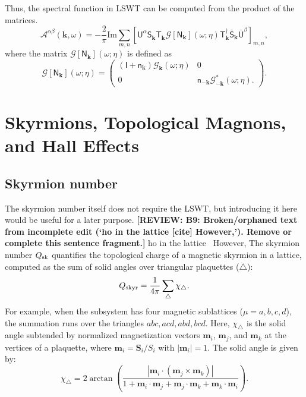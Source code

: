 \documentclass[aps, prx, nofootinbib, superscriptaddress]{revtex4-2}
\newcommand{\REVIEW}[1]{{\color{reviewcolor}\bfseries [REVIEW: #1]}}
\newcommand{\kvec}{\mathbf{k}}
\begin{document}
Thus, the spectral function in LSWT can be computed from the product of the matrices.
\begin{equation}
    \mathcal{A}^{\alpha\beta}(\kvec, \omega) 
    = - \frac{2}{\pi} \mathrm{Im} 
    \sum_{m,n}
    \left[ 
    \mathsf{U}^{\alpha} \mathsf{S}_{\kvec}^{\phantom \dagger} \mathsf{T}_{\kvec}^{\phantom \dagger}
    \mathcal{G} [ \mathsf{N}_{\kvec} ] (\omega ; \eta)
    \mathsf{T}^{\dagger}_{\kvec} \bar{\mathsf{S}}_{\kvec}^{\phantom \dagger} \bar{\mathsf{U}}^{\beta}
    \right]_{m,n},
\end{equation}
where the matrix $\mathcal{G} [ \mathsf{N}_{\kvec} ] (\omega ; \eta)$ is defined as 
\begin{equation}
    \mathcal{G} [ \mathsf{N}_{\kvec} ] (\omega ; \eta)
    = 
    \begin{pmatrix}
        (\mathsf{I} + \mathsf{n}_{\kvec}) \mathcal{G}_{\kvec} (\omega; \eta) & 0 \\
        0 & \mathsf{n}_{-\kvec} \mathcal{G}_{-\kvec}^{*} (\omega; \eta).
    \end{pmatrix}.
\end{equation}





\newpage
\section{Skyrmions, Topological Magnons, and Hall Effects}

\subsection{Skyrmion number}\label{subsec: Skyrmion number}

The skyrmion number itself does not require the LSWT, but introducing it here would be useful for a later purpose.
\REVIEW{B9: Broken/orphaned text from incomplete edit (`ho in the lattice [cite] However,'). Remove or complete this sentence fragment.}
ho in the lattice~\cite{BERG1981412}
However,
The skyrmion number $Q_{\rm sk}$ quantifies the topological charge of a magnetic skyrmion in a lattice, computed as the sum of solid angles over triangular plaquettes ($\triangle$):
\begin{equation}
    Q_{\rm skyr} 
    = \frac{1}{4\pi} \sum_{\triangle} \chi_{\triangle}.
\end{equation}
For example, when the subsystem has four magnetic sublattices ($\mu = a, b, c, d$), the summation runs over the triangles $abc, acd, abd, bcd$.
Here, $\chi_{\triangle}$ is the solid angle subtended by normalized magnetization vectors $\mathbf{m}_i$, $\mathbf{m}_j$, and $\mathbf{m}_k$ at the vertices of a plaquette, where $\mathbf{m}_i = \mathbf{S}_i / S_i$ with $|\mathbf{m}_i| = 1$. The solid angle is given by:
\begin{equation}
    \chi_{\triangle} 
    = 2 \arctan 
    \left( 
    \frac{|\mathbf{m}_i \cdot (\mathbf{m}_j \times \mathbf{m}_k)|}{1 + \mathbf{m}_i \cdot \mathbf{m}_j + \mathbf{m}_j \cdot \mathbf{m}_k + \mathbf{m}_k \cdot \mathbf{m}_i} 
    \right).
\end{equation}
\end{document}
